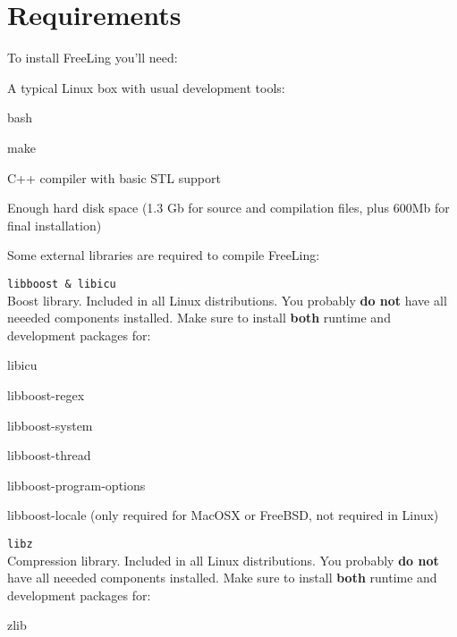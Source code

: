 \documentclass[a4paper]{book}
\begin{document}
\section{Requirements}
\label{sec-requirements}

 To install FreeLing you'll need:

\begin{list}{}{\leftmargin=1em}
 \item A typical Linux box with usual development tools:
   \begin{list}{}{\leftmargin=1em}
    \itemsep 0cm
    \item bash
    \item make
    \item C++ compiler with basic STL support
    \end{list}

 \item Enough hard disk space (1.3 Gb for source and compilation
   files, plus 600Mb for final installation)

 \item Some external libraries are required to compile FreeLing:
    \begin{list}{}{\leftmargin=1em}
    \itemsep 0.25cm

     \item {\tt libboost \& libicu} \\ 
       Boost library. Included in all Linux distributions. You
       probably {\bf do not} have all neeeded components
       installed. Make sure to install {\bf both} runtime and
       development packages for:
      \begin{list}{}{\leftmargin=1em}
       \itemsep 0cm 
         \item libicu
         \item libboost-regex
         \item libboost-system
         \item libboost-thread
         \item libboost-program-options
         \item libboost-locale (only required for MacOSX or FreeBSD, not required in Linux)
      \end{list}

     \item {\tt libz} \\ 
       Compression library. Included in all Linux distributions. You
       probably {\bf do not} have all neeeded components
       installed. Make sure to install {\bf both} runtime and
       development packages for:
      \begin{list}{}{\leftmargin=1em}
       \itemsep 0cm 
         \item zlib
      \end{list}
    \end{list}


\end{list}
\end{document}
